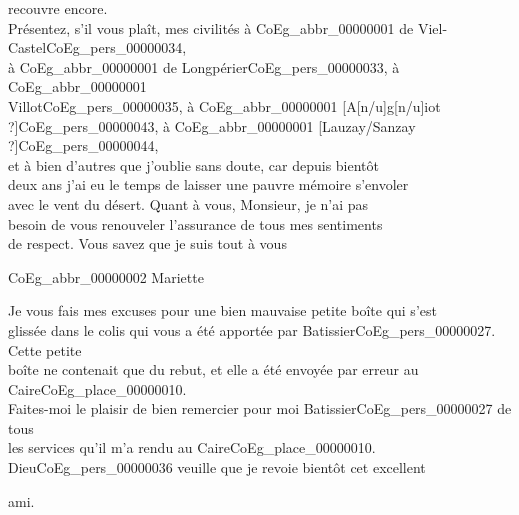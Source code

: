\documentclass{book}
\begin{document}
recouvre encore.\\
\indent Présentez, s’il vous plaît, mes civilités à \gls{CoEg_abbr_00000001} de Viel-Castel\gls{CoEg_pers_00000034},\\
à \gls{CoEg_abbr_00000001} de Longpérier\gls{CoEg_pers_00000033}, à \gls{CoEg_abbr_00000001}\\
Villot\gls{CoEg_pers_00000035}, à \gls{CoEg_abbr_00000001} {[A[n/u]g[n/u]iot ?]}\gls{CoEg_pers_00000043}, à \gls{CoEg_abbr_00000001} {[Lauzay/Sanzay ?]}\gls{CoEg_pers_00000044},\\
et à bien d’autres que j’oublie sans doute, car depuis bientôt\\
deux ans j’ai eu le temps de laisser une pauvre mémoire s’envoler\\
avec le vent du désert. Quant à vous, Monsieur, je n’ai pas\\
besoin de vous renouveler l’assurance de tous mes sentiments\\
de respect. Vous savez que je suis tout à vous
\begin{center} \hspace{5cm}\gls{CoEg_abbr_00000002} Mariette\end{center}
Je vous fais mes excuses pour une bien mauvaise petite boîte qui s’est\\
glissée dans le colis qui vous a été apportée par Batissier\gls{CoEg_pers_00000027}. Cette petite\\
boîte ne contenait que du rebut, et elle a été envoyée par erreur au\\
Caire\gls{CoEg_place_00000010}.\\
\indent Faites-moi le plaisir de bien remercier pour moi Batissier\gls{CoEg_pers_00000027} de tous\\
les services qu’il m’a rendu au Caire\gls{CoEg_place_00000010}. Dieu\gls{CoEg_pers_00000036} veuille que je revoie bientôt cet excellent
\begin{flushright}ami.\end{flushright}
\end{document}
